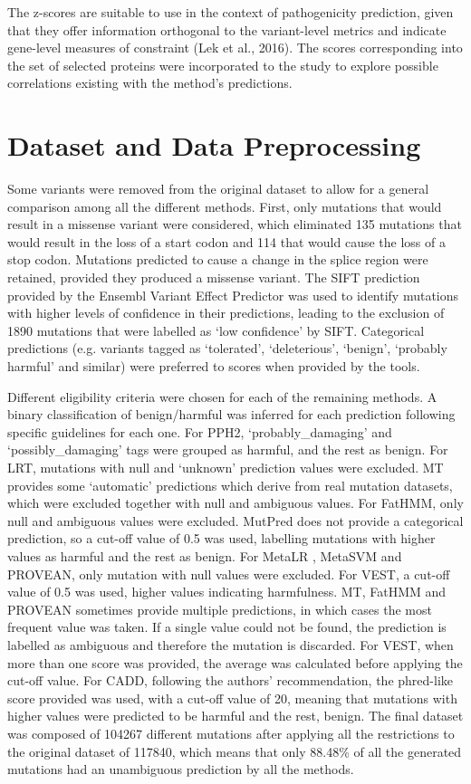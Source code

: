 \documentclass[12pt,MSc,wordcount,anon]{muthesis}
\begin{document}
\begin{flushleft}
The z-scores are suitable to use in the context of pathogenicity prediction, given that they offer  information orthogonal to the variant-level metrics and indicate gene-level measures of constraint (Lek et al., 2016). The scores corresponding into the set of selected proteins were incorporated to the study to explore possible correlations existing with the method's predictions.

\section{Dataset and Data Preprocessing}

Some variants were removed from the original dataset to allow for a general comparison among all the different methods. First, only mutations that would result in a missense variant were considered, which eliminated 135 mutations that would result in the loss of a start codon and 114 that would cause the loss of a stop codon. Mutations predicted to cause a change in the splice region were retained, provided they produced a missense variant. The SIFT prediction provided by the Ensembl Variant Effect Predictor was used to identify mutations with higher levels of confidence in their predictions, leading to the exclusion of 1890 mutations that were labelled as `low confidence' by SIFT. Categorical predictions (e.g. variants tagged as `tolerated', `deleterious', `benign', `probably harmful' and similar) were preferred to scores when provided by the tools.

Different eligibility criteria were chosen for each of the remaining methods. A binary classification of benign/harmful was inferred for each prediction following specific guidelines for each one. For PPH2, `probably\_damaging' and `possibly\_damaging' tags were grouped as harmful, and the rest  as benign. For LRT, mutations with null and `unknown' prediction values were excluded. MT provides some `automatic' predictions which derive from real mutation datasets, which were excluded together with null and ambiguous values. For FatHMM, only null and ambiguous values were excluded. MutPred does not provide a categorical prediction, so a cut-off value of 0.5 was used, labelling mutations with higher values as harmful and the rest as benign. For MetaLR , MetaSVM and PROVEAN, only mutation with null values were excluded. For VEST, a cut-off value of 0.5 was used, higher values indicating harmfulness. MT, FatHMM and PROVEAN sometimes provide multiple predictions, in which cases the most frequent value was taken. If a single value could not be found, the prediction is labelled as ambiguous and therefore the mutation is discarded. For VEST, when more than one score was provided, the average was calculated before applying the cut-off value. For CADD, following the authors' recommendation, the phred-like score provided was used, with a cut-off value of 20, meaning that mutations with higher values were predicted to be harmful and the rest, benign. The final dataset was composed of 104267 different mutations after applying all the restrictions to the original dataset of 117840, which means that only 88.48\% of all the generated mutations had an unambiguous prediction by all the methods.


\end{flushleft}
\end{document}
